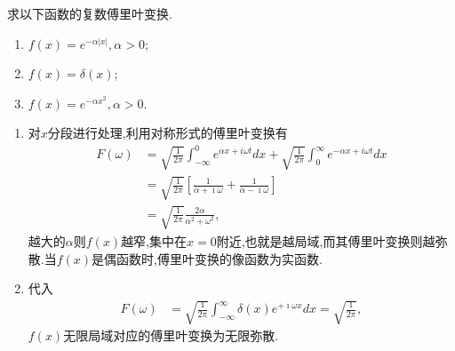 \begin{examplebox}{
求以下函数的复数傅里叶变换.
\begin{enumerate}
    \item $f(x) = e^{-\alpha |x|}, \alpha > 0$;
    \item $f(x) = \delta (x)$;
    \item $f(x) = e^{-\alpha x^2}, \alpha > 0$.
\end{enumerate}
}
\begin{enumerate}
    \item 对$x$分段进行处理,利用对称形式的傅里叶变换有
    \begin{align}
        F(\omega) &=
        \sqrt{\frac{1}{2 \pi}} \int_{-\infty}^0 e^{\alpha x+i \omega t} dx \nonumber
        +
        \sqrt{\frac{1}{2 \pi}} \int_0^{\infty} e^{-\alpha x+i \omega t} dx  \nonumber
        \\
        &= \sqrt{\frac{1}{2 \pi}} \left[\frac{1}{\alpha + \imath \omega } + \frac{1}{\alpha - \imath \omega } \right] \nonumber
        \\
        &= \sqrt{\frac{1}{2 \pi}} \frac{2\alpha}{\alpha^2 + \omega^2}, \nonumber
    \end{align}
    越大的$\alpha$则$f(x)$越窄,集中在$x=0$附近,也就是越局域,而其傅里叶变换则越弥散.当$f(x)$是偶函数时,傅里叶变换的像函数为实函数.

    \item 代入
    \begin{align}
        F(\omega) &=
        \sqrt{\frac{1}{2 \pi}} \int_{-\infty}^{\infty} \delta(x) e^{+\imath \omega x} d x = \sqrt{\frac{1}{2 \pi}} ,
    \end{align}
    $f(x)$无限局域对应的傅里叶变换为无限弥散.


\end{enumerate}
\end{examplebox}
